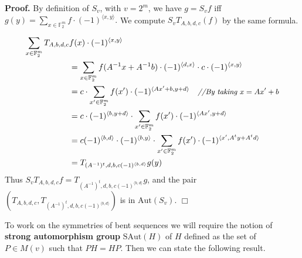 \documentclass[12pt]{article}
\newenvironment{pf}{\noindent\textbf{Proof.}\quad}{\hfill{$\Box$}}
\newcommand{\FF}{\mathbb{F}}
\def\Aut{\mathrm{Aut}}
\def\SAut{\mathrm{SAut}}
\begin{document}
\begin{pf}
 By definition of $S_v$, with $v=2^m$, we have $g=S_v f$ iff $g(y) =
\sum\limits_{x \in \FF_2^m}f \cdot (-1)^{\langle x,y\rangle}.$ We compute $S_v T_{A,b,d,c} (f)$ by the same formula.

\begin{equation*}
\begin{split}
	\sum_{x \in \FF_2^m} T_{A,b,d,c} &f(x)\cdot (-1)^{\langle x,y\rangle} \\
	&= \sum_{x \in \FF_2^m}
	f(A^{-1}x+ A^{-1}b) \cdot (-1)^{\langle d,x\rangle} \cdot c \cdot (-1)^{\langle x,y\rangle} \\
	&= c\cdot \sum_{x' \in \FF_2^m}
	f(x') \cdot (-1)^{\langle Ax'+b,y+d\rangle} \quad \textit{\small//By taking $x=Ax'+b$}\\
	&= c\cdot (-1)^{\langle b,y+d\rangle}\cdot \sum_{x' \in \FF_2^m}
	f(x') \cdot (-1)^{\langle Ax',y+d\rangle}\\
	&= c(-1)^{\langle b,d\rangle}\cdot (-1)^{\langle b,y\rangle}\cdot \sum_{x' \in \FF_2^m}
	f(x') \cdot (-1)^{\langle x',A^ty+A^td\rangle}\\
	&= T_{(A^{-1})^t,d,b,c(-1)^{\langle b,d\rangle}}
	g(y)
\end{split}
\end{equation*}
Thus $S_vT_{A,b,d,c}f=T_{(A^{-1})^t,d,b,c(-1)^{\langle b,d\rangle}}
 g$, and the pair $(T_{A,b,d,c}, T_{(A^{-1})^t,d,b,c(-1)^{\langle b,d\rangle}})$
 is in $\Aut(S_v)$.
\end{pf}


To work on the symmetries
of bent sequences we will require the notion of
{\bf strong  automorphism group} $\SAut(H)$ of $H$ defined as the set of $P \in M(v)$ such that $PH=HP$. Then we can state the following result.
\end{document}

